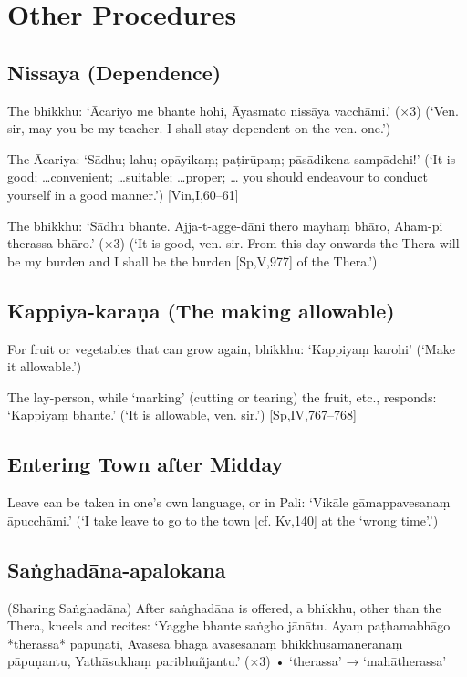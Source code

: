 \chapter{Other Procedures}

\section{Nissaya (Dependence)}

The bhikkhu:
‘Ācariyo me bhante hohi,
Āyasmato nissāya vacchāmi.’ (×3)
(‘Ven. sir, may you be my teacher.
I shall stay dependent on the ven. one.’)

The Ācariya:
‘Sādhu; lahu; opāyikaṃ; paṭirūpaṃ;
pāsādikena sampādehi!’
(‘It is good; …convenient; …suitable; …proper; …
you should endeavour to conduct yourself in a good
manner.’)
[Vin,I,60–61]

The bhikkhu:
‘Sādhu bhante.
Ajja-t-agge-dāni thero mayhaṃ bhāro,
Aham-pi therassa bhāro.’ (×3)
(‘It is good, ven. sir. From this day onwards the
Thera will be my burden and I shall be the burden
[Sp,V,977]
of the Thera.’)

\section{Kappiya-karaṇa (The making allowable)}

For fruit or vegetables that can grow again,
bhikkhu:
‘Kappiyaṃ karohi’
(‘Make it allowable.’)

The lay-person, while ‘marking’ (cutting or
tearing) the fruit, etc., responds:
‘Kappiyaṃ bhante.’
(‘It is allowable, ven. sir.’)
[Sp,IV,767–768]

\section{Entering Town after Midday}

Leave can be taken in one's own language, or
in Pali:
‘Vikāle gāmappavesanaṃ āpucchāmi.’
(‘I take leave to go to the town
[cf. Kv,140]
at the ‘wrong time’.’)

\section{Saṅghadāna-apalokana}

(Sharing Saṅghadāna)
After saṅghadāna is offered, a bhikkhu, other
than the Thera, kneels and recites:
‘Yagghe bhante saṅgho jānātu.
Ayaṃ paṭhamabhāgo *therassa* pāpuṇāti,
Avasesā bhāgā avasesānaṃ
bhikkhusāmaṇerānaṃ pāpuṇantu,
Yathāsukhaṃ paribhuñjantu.’ (×3)
• ‘therassa’ → ‘mahātherassa’

